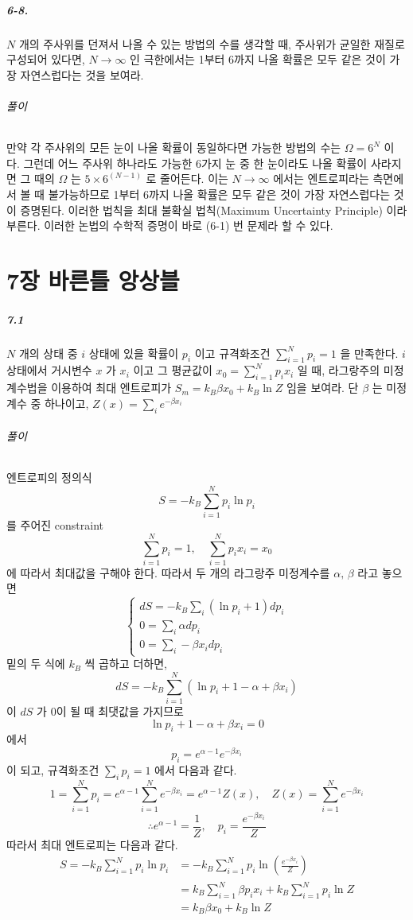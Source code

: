 \documentclass[a4paper,12pt]{report}
\begin{document}
	\paragraph{6-8. } $N$ 개의 주사위를 던져서 나올 수 있는 방법의 수를 생각할 때, 주사위가 균일한 재질로 구성되어 있다면, $N\rightarrow\infty$ 인 극한에서는 1부터 6까지 나올 확률은 모두 같은 것이 가장 자연스럽다는 것을 보여라.
	\subparagraph{풀이} 만약 각 주사위의 모든 눈이 나올 확률이 동일하다면 가능한 방법의 수는 $\Omega=6^N$ 이다. 그런데 어느 주사위 하나라도 가능한 6가지 눈 중 한 눈이라도 나올 확률이 사라지면 그 때의 $\Omega$ 는 $5\times6^{(N-1)}$ 로 줄어든다. 이는 $N\rightarrow\infty$ 에서는 엔트로피라는 측면에서 볼 때 불가능하므로 1부터 6까지 나올 확률은 모두 같은 것이 가장 자연스럽다는 것이 증명된다. 이러한 법칙을 최대 불확실 법칙(Maximum Uncertainty Principle) 이라 부른다. 이러한 논법의 수학적 증명이 바로 (6-1) 번 문제라 할 수 있다. 
	
	\chapter*{7장 바른틀 앙상블}
	\paragraph{7.1 } $N$ 개의 상태 중 $i$ 상태에 있을 확률이 $p_i$ 이고 규격화조건 $\sum_{i=1}^{N}p_i=1$ 을 만족한다. $i$ 상태에서 거시변수 $x$ 가 $x_i$ 이고 그 평균값이 $x_0=\sum_{i=1}^{N}p_ix_i$ 일 때, 라그랑주의 미정계수법을 이용하여 최대 엔트로피가 $S_m=k_B\beta x_0+k_B\ln Z$ 임을 보여라. 단 $\beta$ 는 미정계수 중 하나이고, $Z(x)=\sum_{i} e^{-\beta x_i}$
	\subparagraph{풀이} 엔트로피의 정의식 
	$$S=-k_B\sum_{i=1}^{N}p_i\ln p_i$$ 를 주어진 constraint
	$$\sum_{i=1}^{N}p_i=1,\quad\sum_{i=1}^{N}p_ix_i=x_0$$
	에 따라서 최대값을 구해야 한다. 따라서 두 개의 라그랑주 미정계수를 $\alpha,\,\beta$ 라고 놓으면
	$$\begin{cases}
	dS=-k_B\sum_{i}(\ln p_i+1)dp_i\\
	0=\sum_{i}\alpha dp_i\\
	0=\sum_{i}-\beta x_i dp_i
	\end{cases}$$
	밑의 두 식에 $k_B$ 씩 곱하고 더하면,
	$$dS=-k_B\sum_{i=1}^{N}(\ln p_i+1-\alpha+\beta x_i)$$
	이 $dS$ 가 0이 될 때 최댓값을 가지므로 
	$$\ln p_i+1-\alpha+\beta x_i=0$$
	에서
	$$p_i=e^{\alpha-1}e^{-\beta x_i}$$ 이 되고, 규격화조건 $\sum_i p_i=1$ 에서 다음과 같다. 
	$$1=\sum_{i=1}^{N}p_i=e^{\alpha-1}\sum_{i=1}^{N}e^{-\beta x_i}=e^{\alpha-1}Z(x),\quad Z(x)=\sum_{i=1}^{N}e^{-\beta x_i}$$
	$$\therefore e^{\alpha-1}=\frac{1}{Z},\quad p_i=\frac{e^{-\beta x_i}}{Z}$$
	따라서 최대 엔트로피는 다음과 같다. 
	\begin{equation*}
		\begin{split}
		S=-k_B\sum_{i=1}^{N}p_i\ln p_i&=-k_B\sum_{i=1}^{N}p_i\ln\left(\frac{e^{-\beta x_i}}{Z} \right) \\
		&=k_B\sum_{i=1}^{N}\beta p_ix_i+k_B\sum_{i=1}^{N}p_i\ln Z\\
		&=k_B\beta x_0+k_B\ln Z
		\end{split}
	\end{equation*}
\end{document}
